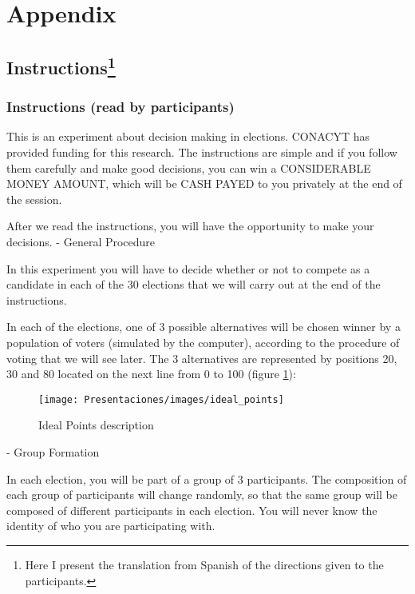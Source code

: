 \chapter*{Appendix}

\section*{Instructions\footnote{Here I present the translation from Spanish of the directions given to the participants.}}




\subsection*{Instructions (read by participants)}

	This is an experiment about decision making in elections. CONACYT has provided funding for this research. The instructions are simple and if you follow them carefully and make good decisions, you can win a CONSIDERABLE MONEY AMOUNT, which will be CASH PAYED to you privately at the end of the session.
	
	After we read the instructions, you will have the opportunity to make your decisions.
	- General Procedure
	
	In this experiment you will have to decide whether or not to compete as a candidate in each of the 30 elections that we will carry out at the end of the instructions.
	
	In each of the elections, one of 3 possible alternatives will be chosen winner by a population of voters (simulated by the computer), according to the procedure of voting that we will see later. The 3 alternatives are represented by positions 20, 30 and 80 located on the next line from 0 to 100 (figure \ref{fig:ideal_points}):
	
\begin{figure}[h]
\centering
\texttt{[image: Presentaciones/images/ideal\_points]}
\caption[Ideal Points]{Ideal Points description}
\label{fig:ideal_points}
\end{figure}

	
	- Group Formation
	
	In each election, you will be part of a group of 3 participants. The composition of each group of participants will change randomly, so that the same group will be composed of different participants in each election. You will never know the identity of who you are participating with.
	
